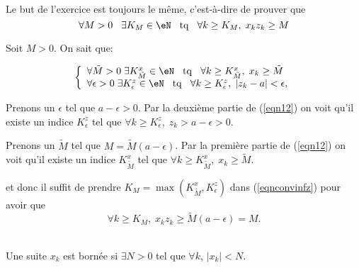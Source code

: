 \vspace{0.5cm}
\\

Le but de l'exercice est toujours le même, c'est-à-dire de prouver que
\begin{equation}		\label{eqnconvinfz}
	\forall M > 0 \hspace{0.3cm} \exists K_M \in \eN \hspace{0.3cm} {\rm tq} \hspace{0.3cm} \forall k \geq K_M, \;x_k  z_k \geq M
\end{equation}

\noindent Soit $M>0$. On sait  que:

\begin{equation}
	\label{eqn12}\left\{\begin{array}{l}
		\forall \tilde{M} >0 \;\exists K^x_{\tilde{M}} \in \eN \hspace{0.3cm} {\rm tq} \hspace{0.3cm} \forall k \geq K^x_{\tilde{M}},\; x_k \geq  \tilde{M} \\
		\forall \epsilon >0\;\exists K^z_\epsilon \in \eN \hspace{0.3cm} {\rm tq} \hspace{0.3cm} \forall k \geq K^z_\epsilon,\; |z_k-a| <\epsilon,
	\end{array}\right.\end{equation}

\noindent Prenons un $\epsilon$ tel que $a-\epsilon>0$. Par la deuxième partie de (\ref{eqn12}) on voit qu'il existe un indice $ K^z_\epsilon$ tel que $ \forall k \geq K^z_\epsilon,\; z_k > a-\epsilon >0$.

\noindent Prenons un $\tilde{M}$ tel que $M= \tilde{M}(a-\epsilon)$. Par la première partie de (\ref{eqn12}) on voit qu'il existe un indice $ K^x_{\tilde{M}} $ tel que $\forall k \geq K^x_{\tilde{M}},\; x_k \geq  \tilde{M} $.


\noindent et donc il suffit  de prendre  $K_M = \max(K_{\tilde{M}}^x, K^z_\epsilon)$ dans (\ref{eqnconvinfz}) pour avoir que
\[ \forall k \geq K_M, \;x_k  z_k \geq \tilde{M}(a-\epsilon)=M.\]


\\

\noindent Une suite $x_k$ est bornée si $\exists N>0$ tel que $\forall k$, $|x_k| < N$.

